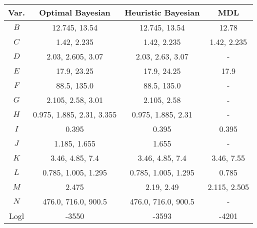 \scriptsize
\begin{tabular}{cccc}
\toprule
Var. & Optimal Bayesian            & Heuristic Bayesian          & MDL          \\
\midrule
$B$    & 12.745, 13.54             & 12.745, 13.54               & 12.78        \\
$C$    & 1.42, 2.235               & 1.42, 2.235                 & 1.42, 2.235  \\
$D$    & 2.03, 2.605, 3.07         & 2.03, 2.63, 3.07            & -            \\
$E$    & 17.9, 23.25               & 17.9, 24.25                 & 17.9         \\
$F$    & 88.5, 135.0               & 88.5, 135.0                 & -            \\
$G$    & 2.105, 2.58, 3.01         & 2.105, 2.58                 & -            \\
$H$    & 0.975, 1.885, 2.31, 3.355 & 0.975, 1.885, 2.31          & -            \\
$I$    & 0.395                     & 0.395                       & 0.395        \\
$J$    & 1.185, 1.655              & 1.655                       & -            \\
$K$    & 3.46, 4.85, 7.4           & 3.46, 4.85, 7.4             & 3.46, 7.55   \\
$L$    & 0.785, 1.005, 1.295       & 0.785, 1.005, 1.295         & 0.785        \\
$M$    & 2.475                     & 2.19, 2.49                  & 2.115, 2.505 \\
$N$    & 476.0, 716.0, 900.5       & 476.0, 716.0, 900.5         & -            \\
\addlinespace[0.5em]
Logl & -3550                     & -3593                       & -4201        \\
\bottomrule
\end{tabular}
